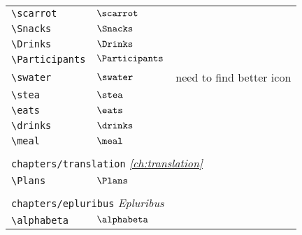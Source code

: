\begin{longtable}{lll}
  {\color[rgb]{0.5,0.5,0.5}\texttt{\textbackslash scarrot}}                                                 & $\scarrot$                 & \\
  {\color[rgb]{0.5,0.5,0.5}\texttt{\textbackslash Snacks}}                                                  & $\Snacks$                  & \\
  {\color[rgb]{0.5,0.5,0.5}\texttt{\textbackslash Drinks}}                                                  & $\Drinks$                  & \\
  {\color[rgb]{0.5,0.5,0.5}\texttt{\textbackslash Participants}}                                            & $\Participants$            & \\
  {\color[rgb]{0.5,0.5,0.5}\texttt{\textbackslash swater}}                                                  & $\swater$                  & need to find better icon\\
  {\color[rgb]{0.5,0.5,0.5}\texttt{\textbackslash stea}}                                                    & $\stea$                    & \\
  {\color[rgb]{0.5,0.5,0.5}\texttt{\textbackslash eats}}                                                    & $\eats$                    & \\
  {\color[rgb]{0.5,0.5,0.5}\texttt{\textbackslash drinks}}                                                  & $\drinks$                  & \\
  {\color[rgb]{0.5,0.5,0.5}\texttt{\textbackslash meal}}                                                    & $\meal$                    &                                                         \\
  &                            &                                                         \\
  \multicolumn{3}{l}{{\color[rgb]{0.5,0.5,0.5}\texttt{chapters/translation}} \emph{\cref{ch:translation}}}
  \\
  \hline
  {\color[rgb]{0.5,0.5,0.5}\texttt{\textbackslash Plans}}                                                   & $\Plans$                   &                                                         \\
  &                            &                                                         \\
  \multicolumn{3}{l}{{\color[rgb]{0.5,0.5,0.5}\texttt{chapters/epluribus}} \emph{Epluribus}}
  \\
  \hline
  {\color[rgb]{0.5,0.5,0.5}\texttt{\textbackslash alphabeta}}                                               & $\alphabeta$               & \\

\end{longtable}

